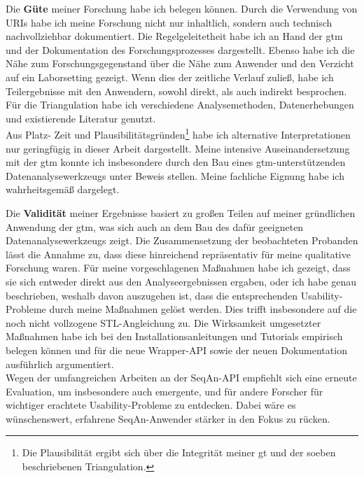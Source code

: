 Die \textbf{Güte} meiner Forschung habe ich belegen können. Durch die Verwendung von URIs habe ich meine Forschung nicht nur inhaltlich, sondern auch technisch nachvollziehbar dokumentiert. Die Regelgeleitetheit habe ich an Hand der \gls{gtm} und der Dokumentation des Forschungsprozesses dargestellt. Ebenso habe ich die Nähe zum Forschungsgegenstand über die Nähe zum Anwender und den Verzicht auf ein Laborsetting gezeigt. Wenn dies der zeitliche Verlauf zuließ, habe ich Teilergebnisse mit den Anwendern, sowohl direkt, als auch indirekt besprochen. Für die Triangulation habe ich verschiedene Analysemethoden, Datenerhebungen und existierende Literatur genutzt.\\
Aus Platz- Zeit und Plausibilitätsgründen\footnote{Die Plausibilität ergibt sich über die Integrität meiner \gls{gt} und der soeben beschriebenen Triangulation.} habe ich alternative Interpretationen nur geringfügig in dieser Arbeit dargestellt. Meine intensive Auseinandersetzung mit der \gls{gtm} konnte ich insbesondere durch den Bau eines \gls{gtm}-unterstützenden Datenanalysewerkzeugs unter Beweis stellen. Meine fachliche Eignung habe ich wahrheitsgemäß dargelegt.

Die \textbf{Validität} meiner Ergebnisse basiert zu großen Teilen auf meiner gründlichen Anwendung der \gls{gtm}, was sich auch an dem Bau des dafür geeigneten Datenanalysewerkzeugs zeigt. Die Zusammensetzung der beobachteten Probanden lässt die Annahme zu, dass diese hinreichend repräsentativ für meine qualitative Forschung waren. Für meine vorgeschlagenen Maßnahmen habe ich gezeigt, dass sie sich entweder direkt aus den Analyseergebnissen ergaben, oder ich habe genau beschrieben, weshalb davon auszugehen ist, dass die entsprechenden Usability-Probleme durch meine Maßnahmen gelöst werden. Dies trifft insbesondere auf die noch nicht vollzogene STL-Angleichung zu. Die Wirksamkeit umgesetzter Maßnahmen habe ich bei den Installationsanleitungen und Tutorials empirisch belegen können und für die neue Wrapper-API sowie der neuen Dokumentation ausführlich argumentiert.\\
Wegen der umfangreichen Arbeiten an der SeqAn-API empfiehlt sich eine erneute Evaluation, um insbesondere auch emergente, und für andere Forscher für wichtiger erachtete Usability-Probleme zu entdecken. Dabei wäre es wünschenswert, erfahrene SeqAn-Anwender stärker in den Fokus zu rücken.

